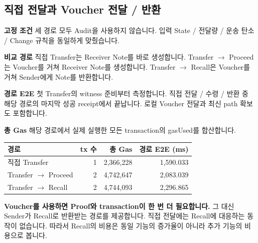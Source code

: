 \documentclass[11pt,a4paper]{article}
\begin{document}
\par\noindent\begin{minipage}{\linewidth}
\subsection*{직접 전달과 Voucher 전달 / 반환}
\textbf{고정 조건}\newline
세 경로 모두 Audit을 사용하지 않습니다.\newline
입력 State / 전달량 / 운송 탄소 / Change 규칙을 동일하게 맞췄습니다.\par\smallskip
\textbf{비교 경로}\newline
직접 Transfer는 Receiver Note를 바로 생성합니다.\newline
Transfer $\rightarrow$ Proceed는 Voucher를 거쳐 Receiver Note를 생성합니다.\newline
Transfer $\rightarrow$ Recall은 Voucher를 거쳐 Sender에게 Note를 반환합니다.\par\smallskip
\textbf{경로 E2E}\newline
첫 Transfer의 witness 준비부터 측정합니다.\newline
직접 전달 / 수령 / 반환 중 해당 경로의 마지막 성공 receipt에서 끝납니다.\newline
로컬 Voucher 전달과 최신 path 확보도 포함합니다.\par\smallskip
\textbf{총 Gas}\newline
해당 경로에서 실제 실행한 모든 transaction의 gasUsed를 합산합니다.\par\smallskip
\begin{center}\small\begin{tabular}{@{}lrrr@{}}\toprule
\textbf{경로} & \textbf{tx 수} & \textbf{총 Gas} & \textbf{경로 E2E (ms)} \\
\midrule
직접 Transfer & 1 & 2,366,228 & 1,590.033 \\
Transfer $\rightarrow$ Proceed & 2 & 4,742,647 & 2,083.039 \\
Transfer $\rightarrow$ Recall & 2 & 4,744,093 & 2,296.865 \\
\bottomrule\end{tabular}\end{center}
\end{minipage}\par\medskip
\textbf{Voucher를 사용하면 Proof와 transaction이 한 번 더 필요합니다.}\newline
그 대신 Sender가 Recall로 반환받는 경로를 제공합니다.\newline
직접 전달에는 Recall에 대응하는 동작이 없습니다.\newline
따라서 Recall의 비용은 동일 기능의 증가율이 아니라 추가 기능의 비용으로 봅니다.
\end{document}
